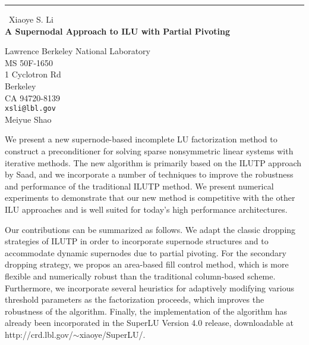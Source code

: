 \documentclass{report}
\begin{document}
\begin{center}
\rule{6in}{1pt} \
{\large Xiaoye S. Li \\
{\bf A Supernodal Approach to ILU with Partial Pivoting}}

Lawrence Berkeley National Laboratory \\ MS 50F-1650 \\ 1 Cyclotron Rd \\ Berkeley \\ CA 94720-8139
\\
{\tt xsli@lbl.gov}\\
Meiyue Shao\end{center}

We present a new supernode-based incomplete LU factorization method
to construct a preconditioner for solving sparse nonsymmetric linear
systems with iterative methods. The new algorithm is primarily based
on the ILUTP approach by Saad, and we incorporate a number of
techniques to improve the robustness and performance of the
traditional ILUTP method. We present numerical experiments to
demonstrate that our new method is competitive with the other ILU
approaches and is well suited for today's high performance architectures.

Our contributions can be summarized as follows. We adapt the classic
dropping strategies of ILUTP in order to incorporate supernode
structures and to accommodate dynamic supernodes due to partial
pivoting. For the secondary dropping strategy, we propos an
area-based fill control method, which is more flexible and numerically
robust than the traditional column-based scheme. Furthermore, we
incorporate several heuristics for adaptively modifying various
threshold parameters as the factorization proceeds, which improves
the robustness of the algorithm. Finally, the implementation of the
algorithm has already been incorporated in the SuperLU Version 4.0
release, downloadable at
http://crd.lbl.gov/$\sim$xiaoye/SuperLU/.
\end{document}
